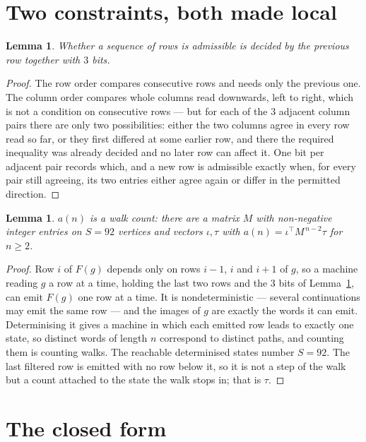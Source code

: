 \documentclass[11pt,a4paper]{article}
\theoremstyle{plain}
\newtheorem{lemma}[theorem]{Lemma}
\theoremstyle{definition}
\begin{document}
\section{Two constraints, both made local}

\begin{lemma}\label{lem:local}
Whether a sequence of rows is admissible is decided by the previous row together with
$3$ bits.
\end{lemma}

\begin{proof}
The row order compares consecutive rows and needs only the previous one. The column order
compares whole columns read downwards, left to right, which is not a condition on consecutive
rows --- but for each of the $3$ adjacent column pairs there are only two possibilities:
either the two columns agree in every row read so far, or they first differed at some earlier
row, and there the required inequality was already decided and no later row can affect it. One
bit per adjacent pair records which, and a new row is admissible exactly when, for every pair
still agreeing, its two entries either agree again or differ in the permitted direction.
\end{proof}

\begin{lemma}\label{lem:det}
$a(n)$ is a walk count: there are a matrix $M$ with non-negative integer entries on $S=92$
vertices and vectors $\iota,\tau$ with $a(n)=\iota^{\!\top}M^{\,n-2}\tau$ for $n\ge2$.
\end{lemma}

\begin{proof}
Row $i$ of $F(g)$ depends only on rows $i-1$, $i$ and $i+1$ of $g$, so a machine reading $g$ a
row at a time, holding the last two rows and the $3$ bits of Lemma~\ref{lem:local}, can
emit $F(g)$ one row at a time. It is nondeterministic --- several continuations may emit the
same row --- and the images of $g$ are exactly the words it can emit. Determinising it gives a
machine in which each emitted row leads to exactly one state, so distinct words of length $n$
correspond to distinct paths, and counting them is counting walks. The reachable determinised
states number $S=92$. The last filtered row is emitted with no row below it, so it is not a
step of the walk but a count attached to the state the walk stops in; that is $\tau$.
\end{proof}

\section{The closed form}
\end{document}
